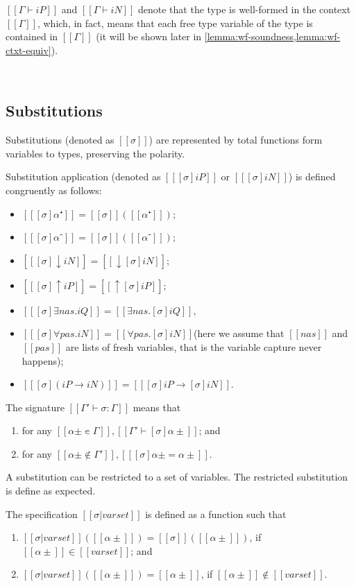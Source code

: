 \documentclass[a4,natbib=false]{article}
\begin{document}
$[[Γ ⊢ iP]]$ and $[[Γ ⊢ iN]]$ denote that the type is well-formed in the context $[[Γ]]$,
which, in fact, means that each free type variable of the type is contained in $[[Γ]]$
(it will be shown later in \cref{lemma:wf-soundness,lemma:wf-ctxt-equiv}).

\hfill\\
\ottdefnsWFT


\subsection{Substitutions}

\begin{definition}[Substitution]
  Substitutions (denoted as $[[σ]]$) 
  are represented by total functions form variables to types, preserving the polarity. 
\end{definition}

\begin{definition}
  Substitution application (denoted as $[[ [σ]iP ]]$ or $[[ [σ]iN ]]$) 
  is defined congruently as follows:
  \begin{itemize}
    \item $[[ [σ]α⁺ ]] = [[σ]] ([[α⁺]])$;
    \item $[[ [σ]α⁻ ]] = [[σ]] ([[α⁻]])$;
    \item $[[ [σ]↓iN ]] = [[↓[σ]iN]]$;
    \item $[[ [σ]↑iP ]] = [[↑[σ]iP]]$;
    \item $[[ [σ]∃nas.iQ ]] = [[∃nas.[σ]iQ]]$, 
    \item $[[ [σ]∀pas.iN ]] = [[∀pas.[σ]iN]]$(here we assume that $[[nas]]$ and $[[pas]]$ are lists of fresh variables, 
      that is the variable capture never happens);
    \item $[[ [σ](iP → iN) ]] = [[ [σ]iP → [σ]iN ]]$.
  \end{itemize}
\end{definition}

\begin{definition}
  The signature $[[Γ' ⊢ σ : Γ]]$ means that
  \begin{enumerate}
    \item for any $[[α± ∊ Γ]], [[ Γ' ⊢ [σ]α± ]]$; and
    \item for any $[[α± ∉ Γ']], [[ [σ]α± = α± ]]$.
  \end{enumerate}
\end{definition}

A substitution can be restricted to a set of variables. 
The restricted substitution is define as expected. 
\begin{definition}
  The specification $[[σ  | varset]]$ is defined as
  a function such that 
  \begin{enumerate}
    \item $[[σ|varset]]([[α± ]]) = [[σ]]([[α± ]])$, if $[[α± ]] \in [[varset]]$; and
    \item $[[σ|varset]]([[α± ]]) = [[α± ]]$, if $[[α± ]] \notin [[varset]]$.
  \end{enumerate}
\end{definition}
\end{document}
